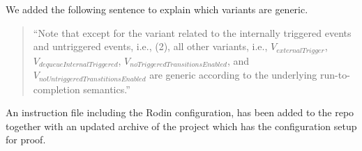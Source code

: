 \documentclass{response}
\begin{document}
\begin{comment}{Reviewer \#1}
• It would be interesting to analyze if the proofs are specific to the ex-
ample or to the underlying semantics?
\end{comment}

\begin{response}
  We added the following sentence to explain which variants are
  generic.
  \begin{quote}
    ``Note that except for the variant related to the internally
    triggered events and untriggered events, i.e., (2), all other
    variants, i.e., $V_{externalTrigger}$,
    $V_{dequeueInternalTriggered}$,
    $V_{noTriggeredTransitionsEnabled}$, and
    $V_{noUntriggeredTranstitionsEnabled}$ are generic according to
    the underlying run-to-completion semantics.''
  \end{quote}
\end{response}
 
\begin{comment}{Reviewer \#1}
  PS Could you put another zip version on the repository: I have had some
strange problems (missing characters) with some machine files? For such
files, I was not able to play again the proofs.
\end{comment}

\begin{response}
An instruction file including the Rodin configuration, has been added
to the repo together with an updated archive of the project which has
the configuration setup for proof.
\end{response}

\begin{comment}{Reviewer \#2}
The paper introduces a technique for the refinement of `run to completion' 
statechart modelling notation (using SCXML language) while preserving safety 
properties. The statechart specification is translated to event-B formalism, 
allowing for formal verification using a theorem prover. The proposed approach 
is demonstrated using a statechart specification of a drone.

Positive points:
+ Interesting topic
+ Technique well motivated
+ The paper is well written and easy to read.

Negative points:
- One single case study is not enough to validate the proposed approach. The 
statechart specification of the drone is rather small. More elaborated models 
are required to validate the proposed approach.
\end{comment}
\end{document}
